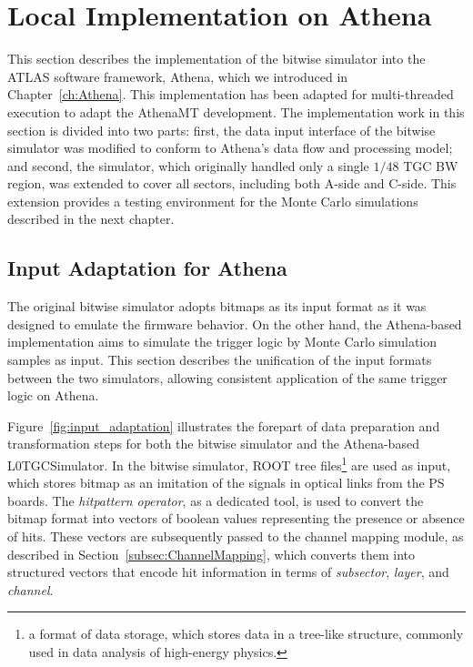 \section{Local Implementation on Athena} \label{sec:LocalImplementationOnAthena}
This section describes the implementation of the bitwise simulator into the ATLAS software framework, Athena, which we introduced in Chapter~\ref{ch:Athena}. This implementation has been adapted for multi-threaded execution to adapt the AthenaMT development. The implementation work in this section is divided into two parts: first, the data input interface of the bitwise simulator was modified to conform to Athena's data flow and processing model; and second, the simulator, which originally handled only a single \(1/48\) TGC BW region, was extended to cover all sectors, including both A-side and C-side. This extension provides a testing environment for the Monte Carlo simulations described in the next chapter.
\subsection{Input Adaptation for Athena} \label{subsec:InputAdaptation}
The original bitwise simulator adopts bitmaps as its input format as it was designed to emulate the firmware behavior. On the other hand, the Athena-based implementation aims to simulate the trigger logic by Monte Carlo simulation samples as input. This section describes the unification of the input formats between the two simulators, allowing consistent application of the same trigger logic on Athena.

Figure~\ref{fig:input_adaptation} illustrates the forepart of data preparation and transformation steps for both the bitwise simulator and the Athena-based L0TGCSimulator. In the bitwise simulator, ROOT tree files\footnote{a format of data storage, which stores data in a tree-like structure, commonly used in data analysis of high-energy physics. } are used as input, which stores bitmap as an imitation of the signals in optical links from the PS boards. The \textit{hitpattern operator}, as a dedicated tool, is used to convert the bitmap format into vectors of boolean values representing the presence or absence of hits. These vectors are subsequently passed to the channel mapping module, as described in Section~\ref{subsec:ChannelMapping}, which converts them into structured vectors that encode hit information in terms of \textit{subsector}, \textit{layer}, and \textit{channel}.

